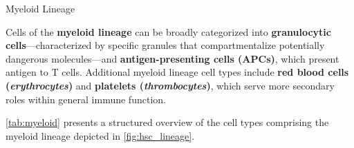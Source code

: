   \begin{core}{Myeloid Lineage}

    Cells of the \textbf{myeloid lineage} can be broadly categorized into \textbf{granulocytic cells}---characterized by specific granules that compartmentalize potentially dangerous molecules---and \textbf{antigen-presenting cells (APCs)}, which present antigen to T cells. Additional myeloid lineage cell types include \textbf{red blood cells (\textit{erythrocytes})} and \textbf{platelets (\textit{thrombocytes})}, which serve more secondary roles within general immune function.

    \autoref{tab:myeloid} presents a structured overview of the cell types comprising the myeloid lineage depicted in \autoref{fig:hsc_lineage}.

  \end{core}

